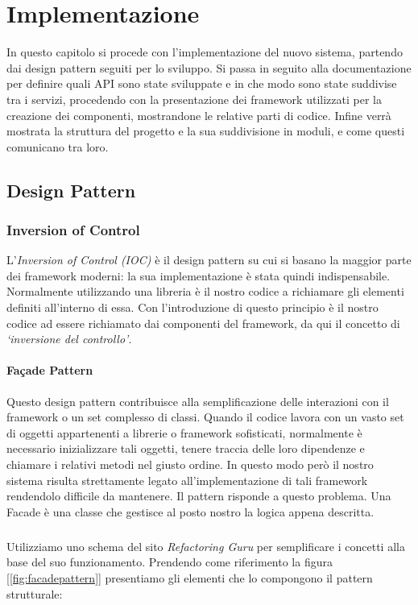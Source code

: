\chapter{Implementazione}
In questo capitolo si procede con l'implementazione del nuovo sistema, partendo dai design pattern seguiti per lo sviluppo. Si passa in seguito alla documentazione per definire quali API sono state sviluppate e in che modo sono state suddivise tra i servizi, procedendo con la presentazione dei framework utilizzati per la creazione dei componenti, mostrandone le relative parti di codice. Infine verrà mostrata la struttura del progetto e la sua suddivisione in moduli, e come questi comunicano tra loro.
\label{chap:implementation}

\section{Design Pattern}
\subsection{Inversion of Control}
L'\emph{Inversion of Control (IOC)} è il design pattern su cui si basano la maggior parte dei framework moderni: la sua implementazione è stata quindi indispensabile. Normalmente utilizzando una libreria è il nostro codice a richiamare gli elementi definiti all'interno di essa. Con l'introduzione di questo principio è il nostro codice ad essere richiamato dai componenti del framework, da qui il concetto di \emph{`inversione del controllo'}.

\subsubsection{Façade Pattern}
Questo design pattern contribuisce alla semplificazione delle interazioni con il framework o un set complesso di classi. Quando il codice lavora con un vasto set di oggetti appartenenti a librerie o framework sofisticati, normalmente è necessario inizializzare tali oggetti, tenere traccia delle loro dipendenze e chiamare i relativi metodi nel giusto ordine. In questo modo però il nostro sistema risulta strettamente legato all’implementazione di tali framework rendendolo difficile da mantenere. Il pattern risponde a questo problema. Una Facade è una classe che gestisce al posto nostro la logica appena descritta.

\paragraph{}Utilizziamo uno schema del sito \emph{Refactoring Guru} \cite{refactoring:facadepattern} per semplificare i concetti alla base del suo funzionamento. Prendendo come riferimento la figura [\ref{fig:facadepattern}] presentiamo gli elementi che lo compongono il pattern strutturale:



